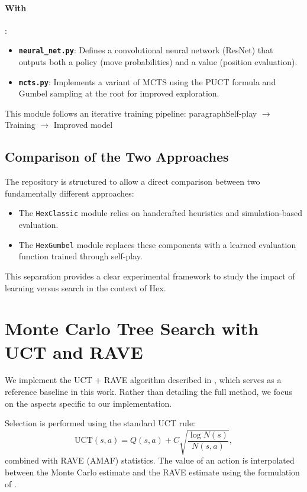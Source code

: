 \documentclass[11pt,a4paper]{article}
\begin{document}
\paragraph{With}:

\begin{itemize}
    \item \textbf{\texttt{neural\_net.py}}: Defines a convolutional neural network (ResNet) that outputs both a policy (move probabilities) and a value (position evaluation).
    
    \item \textbf{\texttt{mcts.py}}: Implements a variant of MCTS using the PUCT formula and Gumbel sampling at the root for improved exploration.
\end{itemize}

This module follows an iterative training pipeline: paragraphSelf-play $\rightarrow$ Training $\rightarrow$ Improved model

\subsection{Comparison of the Two Approaches}

The repository is structured to allow a direct comparison between two fundamentally different approaches:

\begin{itemize}
    \item The \texttt{HexClassic} module relies on handcrafted heuristics and simulation-based evaluation.
    \item The \texttt{HexGumbel} module replaces these components with a learned evaluation function trained through self-play.
\end{itemize}

This separation provides a clear experimental framework to study the impact of learning versus search in the context of Hex.

\section{Monte Carlo Tree Search with UCT and RAVE}

We implement the UCT + RAVE algorithm described in \cite{Cazenave2010MonteCarloH}, which serves as a reference baseline in this work. Rather than detailing the full method, we focus on the aspects specific to our implementation.

\medskip

Selection is performed using the standard UCT rule:
\[
\mathrm{UCT}(s,a) = Q(s,a) + C \sqrt{\frac{\log N(s)}{N(s,a)}},
\]
combined with RAVE (AMAF) statistics. The value of an action is interpolated between the Monte Carlo estimate and the RAVE estimate using the formulation of \cite{Cazenave2010MonteCarloH}.
\end{document}
